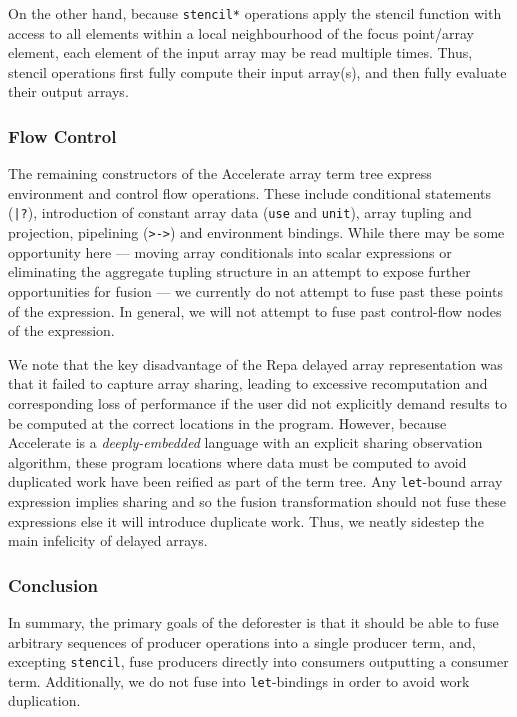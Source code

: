 On the other hand, because \texttt{stencil*} operations apply the stencil
function with access to all elements within a local neighbourhood of the focus
point/array element, each element of the input array may be read multiple times.
Thus, stencil operations first fully compute their input array(s), and then
fully evaluate their output arrays.


\subsubsection{Flow Control}

The remaining constructors of the Accelerate array term tree express environment
and control flow operations. These include conditional statements
(\texttt{|?}), introduction of constant array data (\texttt{use} and
\texttt{unit}), array tupling and projection, pipelining (\texttt{>->}) and
environment bindings. While there may be some opportunity here --- moving array
conditionals into scalar expressions or eliminating the aggregate tupling
structure in an attempt to expose further opportunities for fusion --- we
currently do not attempt to fuse past these points of the expression. In
general, we will not attempt to fuse past control-flow nodes of the expression.

We note that the key disadvantage of the Repa delayed array representation was
that it failed to capture array sharing, leading to excessive recomputation and
corresponding loss of performance if the user did not explicitly demand results
to be computed at the correct locations in the program. However, because
Accelerate is a \emph{deeply-embedded} language with an explicit sharing
observation algorithm, these program locations where data must be computed to
avoid duplicated work have been reified as part of the term tree. Any
\texttt{let}-bound array expression implies sharing and so the fusion
transformation should not fuse these expressions else it will introduce
duplicate work. Thus, we neatly sidestep the main infelicity of delayed arrays.


\subsubsection{Conclusion}

In summary, the primary goals of the deforester is that it should be able to
fuse arbitrary sequences of producer operations into a single producer term,
and, excepting \texttt{stencil}, fuse producers directly into consumers
outputting a consumer term. Additionally, we do not fuse into
\texttt{let}-bindings in order to avoid work duplication.

